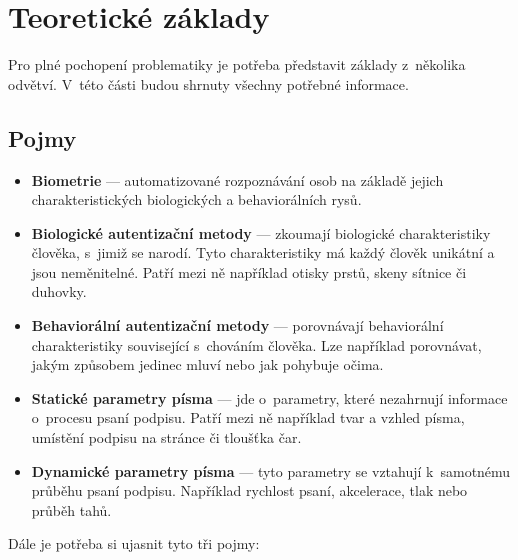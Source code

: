 
\chapter{Teoretické základy}
Pro plné pochopení problematiky je potřeba představit základy z~několika odvětví. 
V~této části budou shrnuty všechny potřebné informace. 

\section{Pojmy}\label{sec:pojmy}
\begin{itemize} 
  \item \textbf{Biometrie} --- automatizované rozpoznávání osob na základě jejich charakteristických biologických a behaviorálních rysů.~\cite{DrahanskýMartin2011} %
  \item \textbf{Biologické autentizační metody} --- zkoumají biologické charakteristiky člověka, s~jimiž se narodí. Tyto charakteristiky má každý člověk unikátní a jsou neměnitelné. Patří mezi ně například otisky prstů, skeny sítnice či duhovky.  
  \item \textbf{Behaviorální autentizační metody} --- porovnávají behaviorální charakteristiky související s~chováním člověka. Lze například porovnávat, jakým způsobem jedinec mluví nebo jak pohybuje očima.
  \item \textbf{Statické parametry písma} --- jde o~parametry, které nezahrnují informace o~procesu psaní podpisu. Patří mezi ně například tvar a vzhled písma, umístění podpisu na stránce či tloušťka čar.
  \item \textbf{Dynamické parametry písma} --- tyto parametry se vztahují k~samotnému průběhu psaní podpisu. Například rychlost psaní, akcelerace, tlak nebo průběh tahů.
\end{itemize}
\noindent
Dále je potřeba si ujasnit tyto tři pojmy:
